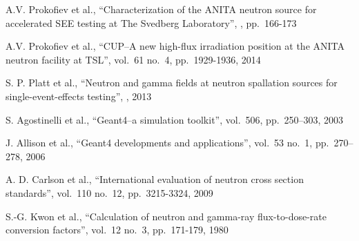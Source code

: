 \documentclass[peerreviewca,11pt,a4paper]{IEEEtran}
\begin{document}
\begin{thebibliography}{9}
A.V. Prokofiev et al.,
\newblock ``Characterization of the ANITA neutron source for accelerated SEE testing at The Svedberg Laboratory'',
, pp.~166-173

A.V. Prokofiev et al.,
\newblock ``CUP--A new high-flux irradiation position at the ANITA neutron facility at TSL'',		 vol.~61 no.~4, pp.~1929-1936, 2014

S. P. Platt et al.,
\newblock ``Neutron and gamma fields at neutron spallation sources for single-event-effects testing'',
, 2013

S. Agostinelli et al.,
\newblock``Geant4--a simulation toolkit'',
 vol.~506, pp.~250--303, 2003

J. Allison et al.,
\newblock ``Geant4 developments and applications'',
 vol.~53 no.~1, pp.~270--278, 2006

A. D. Carlson et al.,
\newblock ``International evaluation of neutron cross section standards'',
 vol.~110 no.~12, pp.~3215-3324, 2009

S.-G. Kwon et al.,
\newblock ``Calculation of neutron and gamma-ray flux-to-dose-rate conversion factors'',
 vol.~12 no.~3, pp.~171-179, 1980

\end{thebibliography}

\cleardoublepage

\todos
\end{document}
